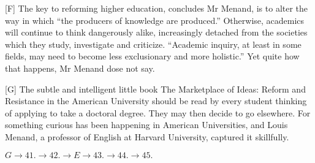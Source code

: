 [F] The key to reforming higher education, concludes Mr Menand, is to alter the way in which ``the producers of knowledge are produced.'' Otherwise, academics will continue to think dangerously alike, increasingly detached from the societies which they study, investigate and criticize. ``Academic inquiry, at least in some fields, may need to become less exclusionary and more holistic.'' Yet quite how that happens, Mr Menand dose not say.

[G] The subtle and intelligent little book The Marketplace of Ideas: Reform and Resistance in the American University should be read by every student thinking of applying to take a doctoral degree. They may then decide to go elsewhere. For something curious has been happening in American Universities, and Louis Menand, a professor of English at Harvard University, captured it skillfully.

\vspace{12pt}

$G \to 41. \to 42. \to E \to 43. \to 44. \to 45.$
